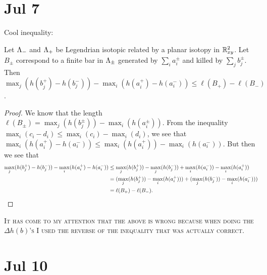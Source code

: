 \documentclass[11pt,oneside]{amsart}
\begin{document}
\section{Jul 7}

Cool inequality:
\begin{theorem}
    Let $\Lambda_-$ and $\Lambda_+$ be Legendrian isotopic related by a planar isotopy in $\mathbb R^2_{xy}$. Let $B_\pm$ correspond to a finite bar in $\Lambda_\pm$ generated by $\sum_{i}a_i^{\pm}$ and killed by $\sum_{j}b_j^{\pm}$. Then $\max_j(h(b_j^+)-h(b_j^-))-\max_i(h(a_i^+)-h(a_i^-))\leq \ell(B_+)-\ell(B_-)$.
\end{theorem}
\begin{proof}
    We know that the length $\ell(B_\pm)=\max_j(h(b_j^\pm))-\max_i(h(a_i^\pm))$. From the inequality $\max_i(c_i-d_i)\leq \max_i(c_i)-\max_i(d_i)$, we see that $\max_i(h(a_i^+)-h(a_i^-))\leq \max_i(h(a_i^+))-\max_i(h(a_i^-))$. But then we see that
    \begin{align*}
        \max_j(h(b_j^+)-h(b_j^-))-\max_i(h(a_i^+)-h(a_i^-))&\leq \max_j(h(b_j^+))-\max_j(h(b_j^-))+\max_i(h(a_i^-))-\max_i(h(a_i^+))\\&=(\max_j(h(b_j^+))-\max_i(h(a_i^+)))+(\max_j(h(b_j^-))-\max_i(h(a_i^-)))\\&=\ell(B_+)-\ell(B_-).\qedhere
    \end{align*}
\end{proof}

{\color{red}\textsc{It has come to my attention that the above is wrong because when doing the $\Delta h(b)$'s I used the reverse of the inequality that was actually correct.}}

\section{Jul 10}
\end{document}
